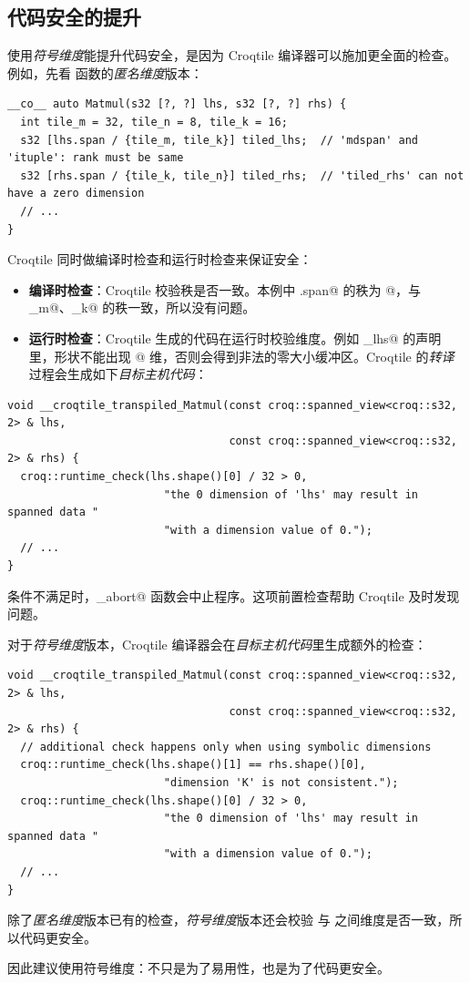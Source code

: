 \subsection*{代码安全的提升}

使用\emph{符号维度}能提升代码安全，是因为 Croqtile 编译器可以施加更全面的检查。例如，先看 \co@Matmul@ 函数的\emph{匿名维度}版本：

\begin{lstlisting}[language=croqtile,caption={使用匿名维度的核函数}]
__co__ auto Matmul(s32 [?, ?] lhs, s32 [?, ?] rhs) {
  int tile_m = 32, tile_n = 8, tile_k = 16;
  s32 [lhs.span / {tile_m, tile_k}] tiled_lhs;  // 'mdspan' and 'ituple': rank must be same
  s32 [rhs.span / {tile_k, tile_n}] tiled_rhs;  // 'tiled_rhs' can not have a zero dimension
  // ...
}
\end{lstlisting}

Croqtile 同时做编译时检查和运行时检查来保证安全：

\begin{itemize}[leftmargin=1.6em]
\item \textbf{编译时检查}：Croqtile 校验秩是否一致。本例中 \co@lhs.span@ 的秩为 @，与 \co@tile_m@、\co@tile_k@ 的秩一致，所以没有问题。
\item \textbf{运行时检查}：Croqtile 生成的代码在运行时校验维度。例如 \co@tiled_lhs@ 的声明里，形状不能出现 @ 维，否则会得到非法的零大小缓冲区。Croqtile 的\emph{转译}过程会生成如下\emph{目标主机代码}：
\end{itemize}

\begin{lstlisting}[language=croqtile,caption={转译后的函数签名}]
void __croqtile_transpiled_Matmul(const croq::spanned_view<croq::s32, 2> & lhs,
                                  const croq::spanned_view<croq::s32, 2> & rhs) {
  croq::runtime_check(lhs.shape()[0] / 32 > 0,
                        "the 0 dimension of 'lhs' may result in spanned data "
                        "with a dimension value of 0.");
  // ...
}
\end{lstlisting}

条件不满足时，\co@croqtile_abort@ 函数会中止程序。这项前置检查帮助 Croqtile 及时发现问题。

对于\emph{符号维度}版本，Croqtile 编译器会在\emph{目标主机代码}里生成额外的检查：

\begin{lstlisting}[language=croqtile,caption={生成的形状检查}]
void __croqtile_transpiled_Matmul(const croq::spanned_view<croq::s32, 2> & lhs,
                                  const croq::spanned_view<croq::s32, 2> & rhs) {
  // additional check happens only when using symbolic dimensions
  croq::runtime_check(lhs.shape()[1] == rhs.shape()[0],
                        "dimension 'K' is not consistent.");
  croq::runtime_check(lhs.shape()[0] / 32 > 0,
                        "the 0 dimension of 'lhs' may result in spanned data "
                        "with a dimension value of 0.");
  // ...
}
\end{lstlisting}

除了\emph{匿名维度}版本已有的检查，\emph{符号维度}版本还会校验 \co@lhs@ 与 \co@rhs@ 之间维度是否一致，所以代码更安全。

因此建议使用符号维度：不只是为了易用性，也是为了代码更安全。
